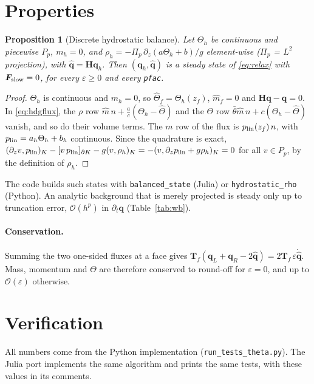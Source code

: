 \documentclass[11pt,a4paper]{article}
\newtheorem{proposition}{Proposition}
\newcommand{\qh}{\hat{\bm q}}
\newcommand{\q}{\bm q}
\newcommand{\thb}{\bar\theta}
\begin{document}
\section{Properties}
\begin{proposition}[Discrete hydrostatic balance]\label{prop:wb}
Let $\Theta_h$ be continuous and piecewise $P_p$, $m_h=0$, and
$\rho_h=-\Pi_p\,\partial_z(a\Theta_h+b)/g$ element-wise ($\Pi_p$ = $L^2$ projection), with
$\qh=\bm H\q_h$. Then $(\q_h,\qh)$ is a steady state of \eqref{eq:relax} with $\bm F_{\rm slow}=0$,
for every $\varepsilon\ge0$ and every \texttt{pfac}.
\end{proposition}
\begin{proof}
$\Theta_h$ is continuous and $m_h=0$, so $\hat\Theta_f=\Theta_h(z_f)$, $\hat m_f=0$ and
$\bm H\q-\qh=0$. In \eqref{eq:hdgflux}, the $\rho$ row $\hat m\,n+\tfrac{a}{c}(\Theta_h-\hat\Theta)$
and the $\Theta$ row $\thb\hat m\,n+c(\Theta_h-\hat\Theta)$ vanish, and so do their volume terms.
The $m$ row of the flux is $p_{\rm lin}(z_f)\,n$, with $p_{\rm lin}=a_h\Theta_h+b_h$ continuous.
Since the quadrature is exact,
$(\partial_zv,p_{\rm lin})_K-[v\,p_{\rm lin}]_{\partial K}-g(v,\rho_h)_K
=-(v,\partial_zp_{\rm lin}+g\rho_h)_K=0$ for all $v\in P_p$, by the definition of $\rho_h$.
\end{proof}
The code builds such states with \texttt{balanced\_state} (Julia) or \texttt{hydrostatic\_rho}
(Python). An analytic background that is merely projected is steady only up to truncation error,
$\mathcal O(h^{p})$ in $\partial_t\q$ (Table~\ref{tab:wb}).

\paragraph{Conservation.} Summing the two one-sided fluxes at a face gives
$\bm T_f(\q_L+\q_R-2\qh)=2\bm T_f\,\varepsilon\dot{\qh}$. Mass, momentum and $\Theta$ are therefore
conserved to round-off for $\varepsilon=0$, and up to $\mathcal O(\varepsilon)$ otherwise.

\section{Verification}
All numbers come from the Python implementation (\texttt{run\_tests\_theta.py}). The Julia port
implements the same algorithm and prints the same tests, with these values in its comments.
\end{document}
